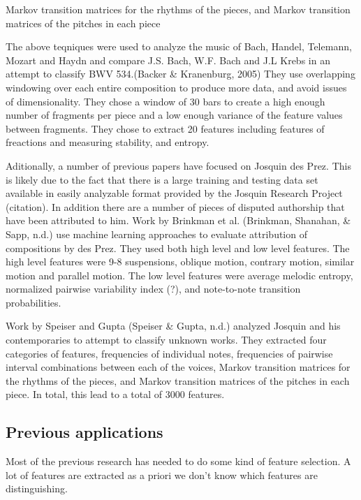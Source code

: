 \documentclass[12pt,twoside]{reedthesis}
\theoremstyle{definition}
\theoremstyle{definition}
\theoremstyle{definition}
\theoremstyle{remark}
\begin{document}
Markov transition matrices for the rhythms of the pieces, and Markov
transition matrices of the pitches in each piece

The above teqniques were used to analyze the music of Bach, Handel,
Telemann, Mozart and Haydn and compare J.S. Bach, W.F. Bach and J.L
Krebs in an attempt to classify BWV 534.(Backer \& Kranenburg, 2005)
They use overlapping windowing over each entire composition to produce
more data, and avoid issues of dimensionality. They chose a window of 30
bars to create a high enough number of fragments per piece and a low
enough variance of the feature values between fragments. They chose to
extract 20 features including features of freactions and measuring
stability, and entropy.

Aditionally, a number of previous papers have focused on Josquin des
Prez. This is likely due to the fact that there is a large training and
testing data set available in easily analyzable format provided by the
Josquin Research Project (citation). In addition there are a number of
pieces of disputed authorship that have been attributed to him. Work by
Brinkman et al. (Brinkman, Shanahan, \& Sapp, n.d.) use machine learning
approaches to evaluate attribution of compositions by des Prez. They
used both high level and low level features. The high level features
were 9-8 suspensions, oblique motion, contrary motion, similar motion
and parallel motion. The low level features were average melodic
entropy, normalized pairwise variability index (?), and note-to-note
transition probabilities.

Work by Speiser and Gupta (Speiser \& Gupta, n.d.) analyzed Josquin and
his contemporaries to attempt to classify unknown works. They extracted
four categories of features, frequencies of individual notes,
frequencies of pairwise interval combinations between each of the
voices, Markov transition matrices for the rhythms of the pieces, and
Markov transition matrices of the pitches in each piece. In total, this
lead to a total of 3000 features.

\subsection{Previous applications}\label{previous-applications}

Most of the previous research has needed to do some kind of feature
selection. A lot of features are extracted as a priori we don't know
which features are distinguishing.
\end{document}
